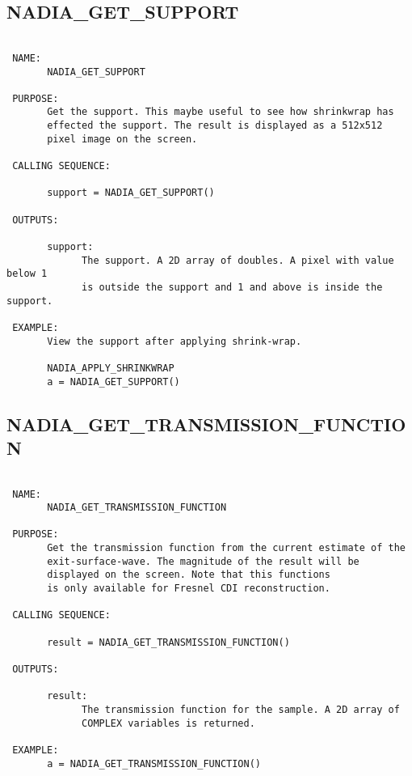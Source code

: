  
\subsection{NADIA\_GET\_SUPPORT}
\begin{verbatim}

 NAME:
       NADIA_GET_SUPPORT

 PURPOSE:
       Get the support. This maybe useful to see how shrinkwrap has
       effected the support. The result is displayed as a 512x512 
       pixel image on the screen.

 CALLING SEQUENCE:

       support = NADIA_GET_SUPPORT()

 OUTPUTS:

       support:
             The support. A 2D array of doubles. A pixel with value below 1
             is outside the support and 1 and above is inside the support.

 EXAMPLE:
       View the support after applying shrink-wrap.
 
       NADIA_APPLY_SHRINKWRAP
       a = NADIA_GET_SUPPORT()

\end{verbatim}

\subsection{NADIA\_GET\_TRANSMISSION\_FUNCTION}
\begin{verbatim}

 NAME:
       NADIA_GET_TRANSMISSION_FUNCTION

 PURPOSE:
       Get the transmission function from the current estimate of the
       exit-surface-wave. The magnitude of the result will be
       displayed on the screen. Note that this functions
       is only available for Fresnel CDI reconstruction.

 CALLING SEQUENCE:

       result = NADIA_GET_TRANSMISSION_FUNCTION()

 OUTPUTS:

       result:
             The transmission function for the sample. A 2D array of
             COMPLEX variables is returned. 

 EXAMPLE:
       a = NADIA_GET_TRANSMISSION_FUNCTION()

\end{verbatim}

 
